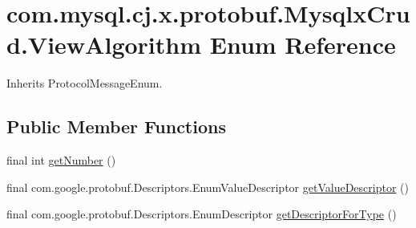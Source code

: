 \hypertarget{enumcom_1_1mysql_1_1cj_1_1x_1_1protobuf_1_1_mysqlx_crud_1_1_view_algorithm}{}\section{com.\+mysql.\+cj.\+x.\+protobuf.\+Mysqlx\+Crud.\+View\+Algorithm Enum Reference}
\label{enumcom_1_1mysql_1_1cj_1_1x_1_1protobuf_1_1_mysqlx_crud_1_1_view_algorithm}


Inherits Protocol\+Message\+Enum.

\subsection*{Public Member Functions}
\begin{DoxyCompactItemize}
\item 
final int \mbox{\hyperlink{enumcom_1_1mysql_1_1cj_1_1x_1_1protobuf_1_1_mysqlx_crud_1_1_view_algorithm_ab57c7c4de40e6b9664b878cd0444f8ec}{get\+Number}} ()
\item 
final com.\+google.\+protobuf.\+Descriptors.\+Enum\+Value\+Descriptor \mbox{\hyperlink{enumcom_1_1mysql_1_1cj_1_1x_1_1protobuf_1_1_mysqlx_crud_1_1_view_algorithm_ac475550d12aa4a4cab6bb6d60fa00061}{get\+Value\+Descriptor}} ()
\item 
final com.\+google.\+protobuf.\+Descriptors.\+Enum\+Descriptor \mbox{\hyperlink{enumcom_1_1mysql_1_1cj_1_1x_1_1protobuf_1_1_mysqlx_crud_1_1_view_algorithm_a5b72d0bf9e949157324b30a0665319d2}{get\+Descriptor\+For\+Type}} ()
\end{DoxyCompactItemize}
